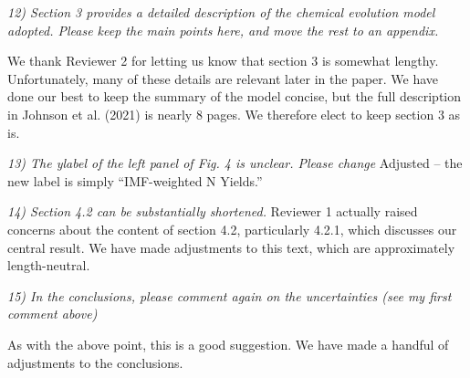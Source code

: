 \documentclass[12pt]{article}
\newcommand\doublebreak[0]{\par\null\par\noindent}
\begin{document}
\doublebreak
\textit{%
12) Section 3 provides a detailed description of the chemical evolution model
adopted.
Please keep the main points here, and move the rest to an appendix.
}
\doublebreak
We thank Reviewer 2 for letting us know that section 3 is somewhat lengthy.
Unfortunately, many of these details are relevant later in the paper.
We have done our best to keep the summary of the model concise, but the full
description in Johnson et al. (2021) is nearly 8 pages.
We therefore elect to keep section 3 as is.
\doublebreak
\textit{%
13) The ylabel of the left panel of Fig. 4 is unclear. Please change
}
Adjusted -- the new label is simply ``IMF-weighted N Yields.''
\doublebreak
\textit{%
14) Section 4.2 can be substantially shortened.
}
Reviewer 1 actually raised concerns about the content of section 4.2,
particularly 4.2.1, which discusses our central result.
We have made adjustments to this text, which are approximately length-neutral.
\doublebreak
\textit{%
15) In the conclusions, please comment again on the uncertainties (see my first
comment above)
}
\doublebreak
As with the above point, this is a good suggestion.
We have made a handful of adjustments to the conclusions.
\end{document}
